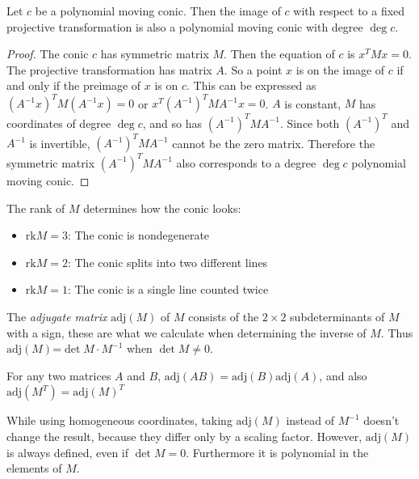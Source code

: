 \documentclass[a4paper]{article}
\begin{document}
\begin{theorem}
    Let $c$ be a polynomial moving conic. Then the image of $c$ with respect to a fixed projective transformation is also a polynomial moving conic with degree $\deg c$.
\end{theorem}
\begin{proof}
    The conic $c$ has symmetric matrix $M$. Then the equation of $c$ is $x^TMx=0$. The projective transformation has matrix $A$. So a point $x$ is on the image of $c$ if and only if the preimage of $x$ is on $c$. This can be expressed as $(A^{-1}x)^TM(A^{-1}x)=0$ or $x^T(A^{-1})^TMA^{-1}x=0$. $A$ is constant, $M$ has coordinates of degree $\deg c$, and so has $(A^{-1})^TMA^{-1}$. Since both $(A^{-1})^T$ and $A^{-1}$ is invertible, $(A^{-1})^TMA^{-1}$ cannot be the zero matrix. Therefore the symmetric matrix $(A^{-1})^TMA^{-1}$ also corresponds to a degree $\deg c$ polynomial moving conic.
\end{proof}

The rank of $M$ determines how the conic looks:

\begin{itemize}
    \item $\mathrm{rk}M=3$: The conic is nondegenerate
    \item $\mathrm{rk}M=2$: The conic splits into two different lines
    \item $\mathrm{rk}M=1$: The conic is a single line counted twice
\end{itemize}


The \textit{adjugate matrix} $\mathrm{adj}(M)$ of $M$ consists of the $2\times 2$ subdeterminants of $M$ with a sign, these are what we calculate when determining the inverse of $M$. Thus $\mathrm{adj}(M)$=$\det M \cdot M^{-1}$ when $\det M\ne 0$.

For any two matrices $A$ and $B$, $\mathrm{adj}(AB)=\mathrm{adj}(B)\mathrm{adj}(A)$, and also $\mathrm{adj}(M^T)=\mathrm{adj}(M)^T$

While using homogeneous coordinates, taking $\mathrm{adj}(M)$ instead of $M^{-1}$ doesn't change the result, because they differ only by a scaling factor. However, $\mathrm{adj}(M)$ is always defined, even if $\det M=0$. Furthermore it is polynomial in the elements of $M$.
\end{document}
